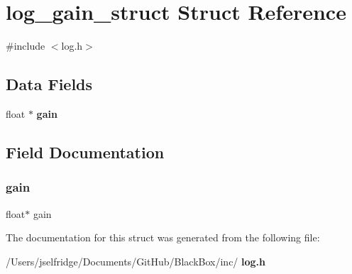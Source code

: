 \section{log\+\_\+gain\+\_\+struct Struct Reference}
\label{structlog__gain__struct}


{\ttfamily \#include $<$log.\+h$>$}

\subsection*{Data Fields}
\begin{DoxyCompactItemize}
\item 
float $\ast$ \textbf{ gain}
\end{DoxyCompactItemize}


\subsection{Field Documentation}
\mbox{\label{structlog__gain__struct_aab0433991fbc9024d950e72c99daf19b}} 
\subsubsection{gain}
{\footnotesize\ttfamily float$\ast$ gain}



The documentation for this struct was generated from the following file\+:\begin{DoxyCompactItemize}
\item 
/\+Users/jselfridge/\+Documents/\+Git\+Hub/\+Black\+Box/inc/\textbf{ log.\+h}\end{DoxyCompactItemize}
